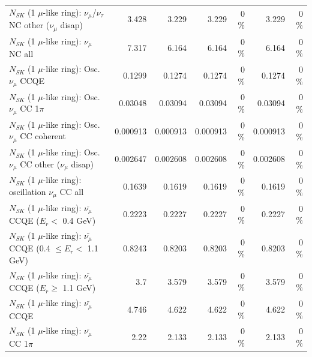 \begin{table}
\begin{tabular}{| l | r | r | r  r | r  r |}
   $N_{SK}$ (1 $\mu$-like ring): $\nu_\mu$/$\nu_\tau$ NC other ($\nu_\mu$ disap) &           3.428 &           3.229 &           3.229 &        0 \%  &           3.229 &        0 \%  \\ 
                                $N_{SK}$ (1 $\mu$-like ring): $\nu_{\mu}$ NC all &           7.317 &           6.164 &           6.164 &        0 \%  &           6.164 &        0 \%  \\ 
\hline
\hline
                               $N_{SK}$ (1 $\mu$-like ring): Osc. $\nu_\mu$ CCQE &          0.1299 &          0.1274 &          0.1274 &        0 \%  &          0.1274 &        0 \%  \\ 
                          $N_{SK}$ (1 $\mu$-like ring): Osc. $\nu_\mu$ CC 1$\pi$ &         0.03048 &         0.03094 &         0.03094 &        0 \%  &         0.03094 &        0 \%  \\ 
                        $N_{SK}$ (1 $\mu$-like ring): Osc. $\nu_\mu$ CC coherent &        0.000913 &        0.000913 &        0.000913 &        0 \%  &        0.000913 &        0 \%  \\ 
         $N_{SK}$ (1 $\mu$-like ring): Osc. $\nu_\mu$ CC other ($\nu_\mu$ disap) &        0.002647 &        0.002608 &        0.002608 &        0 \%  &        0.002608 &        0 \%  \\ 
                      $N_{SK}$ (1 $\mu$-like ring): oscillation $\nu_\mu$ CC all &          0.1639 &          0.1619 &          0.1619 &        0 \%  &          0.1619 &        0 \%  \\ 
\hline
\hline
          $N_{SK}$ (1 $\mu$-like ring): $\bar{\nu_\mu}$ CCQE ($E_{r} <$ 0.4 GeV) &          0.2223 &          0.2227 &          0.2227 &        0 \%  &          0.2227 &        0 \%  \\ 
 $N_{SK}$ (1 $\mu$-like ring): $\bar{\nu_\mu}$ CCQE (0.4 $\leq E_{r} <$ 1.1 GeV) &          0.8243 &          0.8203 &          0.8203 &        0 \%  &          0.8203 &        0 \%  \\ 
       $N_{SK}$ (1 $\mu$-like ring): $\bar{\nu_\mu}$ CCQE ($E_{r} \geq$ 1.1 GeV) &             3.7 &           3.579 &           3.579 &        0 \%  &           3.579 &        0 \%  \\ 
\hline
                              $N_{SK}$ (1 $\mu$-like ring): $\bar{\nu_\mu}$ CCQE &           4.746 &           4.622 &           4.622 &        0 \%  &           4.622 &        0 \%  \\ 
                         $N_{SK}$ (1 $\mu$-like ring): $\bar{\nu_\mu}$ CC 1$\pi$ &            2.22 &           2.133 &           2.133 &        0 \%  &           2.133 &        0 \%  \\ 

\end{tabular}
\end{table}
